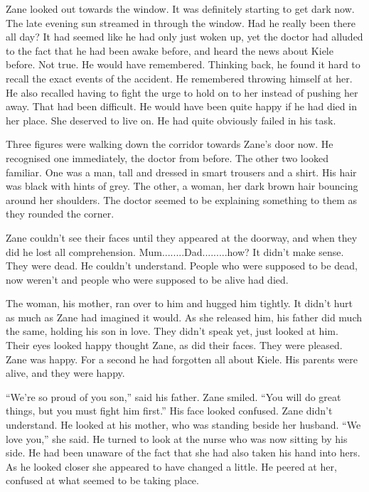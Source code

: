 Zane looked out towards the window.  It was definitely starting to get dark now.  The late evening sun streamed in through the window.  Had he really been there all day?  It had seemed like he had only just woken up, yet the doctor had alluded to the fact that he had been awake before, and heard the news about Kiele before.  Not true.  He would have remembered.  Thinking back, he found it hard to recall the exact events of the accident.  He remembered throwing himself at her.  He also recalled having to fight the urge to hold on to her instead of pushing her away.  That had been difficult.  He would have been quite happy if he had died in her place.  She deserved to live on.  He had quite obviously failed in his task.

Three figures were walking down the corridor towards Zane's door now.  He recognised one immediately, the doctor from before.  The other two looked familiar.  One was a man, tall and dressed in smart trousers and a shirt.  His hair was black with hints of grey.  The other, a woman, her dark brown hair bouncing around her shoulders.  The doctor seemed to be explaining something to them as they rounded the corner.  

Zane couldn't see their faces until they appeared at the doorway, and when they did he lost all comprehension.  Mum........Dad.........how?  It didn't make sense.  They were dead.  He couldn't understand.  People who were supposed to be dead, now weren't and people who were supposed to be alive had died.  

The woman, his mother, ran over to him and hugged him tightly.  It didn't hurt as much as Zane had imagined it would.  As she released him, his father did much the same, holding his son in love.  They didn't speak yet, just looked at him.  Their eyes looked happy thought Zane, as did their faces.  They were pleased.  Zane was happy.  For a second he had forgotten all about Kiele.  His parents were alive, and they were happy.

``We're so proud of you son,'' said his father.  Zane smiled.  ``You will do great things, but you must fight him first.''  His face looked confused.  Zane didn't understand.  He looked at his mother, who was standing beside her husband.  ``We love you,'' she said.  He turned to look at the nurse who was now sitting by his side.  He had been unaware of the fact that she had also taken his hand into hers.  As he looked closer she appeared to have changed a little.  He peered at her, confused at what seemed to be taking place.


